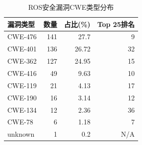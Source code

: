 
\begin{table}[htbp]
\centering
\caption{ROS安全漏洞CWE类型分布}
\label{tab:cwe_dist}
\begin{tabular}{lrrr}
\hline
漏洞类型 & 数量 & 占比(\%) & Top 25排名 \\
\hline
CWE-476 & 141 & 27.7 & 9 \\
CWE-401 & 136 & 26.72 & 32 \\
CWE-362 & 127 & 24.95 & 15 \\
CWE-416 & 49 & 9.63 & 10 \\
CWE-119 & 21 & 4.13 & 17 \\
CWE-190 & 16 & 3.14 & 12 \\
CWE-134 & 12 & 2.36 & 36 \\
CWE-78 & 6 & 1.18 & 7 \\
unknown & 1 & 0.2 & N/A \\
\hline
\end{tabular}
\end{table}
